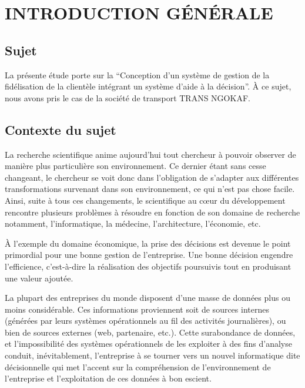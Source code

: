 \chapter*{INTRODUCTION GÉNÉRALE}
    \section[Sujet]{Sujet}
    La présente étude porte sur la \enquote{Conception d’un système de gestion
    de la fidélisation de la clientèle intégrant un système d’aide à la décision}.
    À ce sujet, nous avons pris le cas de la société de transport TRANS NGOKAF.
    \section[Contexte du sujet]{Contexte du sujet}
    La recherche scientifique anime aujourd’hui tout chercheur
    à pouvoir observer de manière
    plus particulière son environnement. Ce dernier étant
    sans cesse changeant, le chercheur se voit donc
    dans l’obligation de s’adapter aux différentes transformations
    survenant dans son environnement, ce qui n’est pas chose facile.
    Ainsi, suite à tous ces changements, le scientifique au cœur du
    développement rencontre plusieurs problèmes à résoudre en
    fonction de son domaine de recherche notamment, l’informatique,
    la médecine, l’architecture, l’économie, etc.
    \newline

    À l’exemple du domaine
    économique, la prise des décisions est devenue
    le point primordial pour une bonne gestion de
    l’entreprise. Une bonne décision engendre l’efficience,
    c’est-à-dire la réalisation des objectifs
    poursuivis tout en produisant une valeur ajoutée.
    \newline

    La plupart des entreprises du monde disposent d’une masse de données plus ou
    moins considérable. Ces informations proviennent soit de sources internes (générées par
    leurs systèmes opérationnels au fil des activités journalières), ou bien de sources externes
    (web, partenaire, etc.). Cette surabondance de données, et l’impossibilité des systèmes
    opérationnels de les exploiter à des fins d’analyse conduit, inévitablement, l’entreprise à se
    tourner vers un nouvel informatique dite décisionnelle qui met l’accent sur la
    compréhension de l’environnement de l’entreprise et l’exploitation de ces données à bon
    escient.
    \newline

